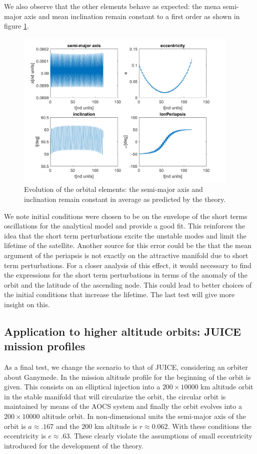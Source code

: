 We also observe that the other elements behave as expected: the mena semi-major axis and mean inclination remain constant to a first order as shown in figure \ref{fig:elementsUnstable}.

\begin{figure}[H]
	\centering
	\includegraphics[height=3in]
	{figures/Europa200km01e60i/elements.png}
	\caption{Evolution of the orbital elements: the semi-major axis and inclination remain constant in average as predicted by the theory.}
	\label{fig:elementsUnstable}
\end{figure}

We note initial conditions were chosen to be on the envelope of the short terms oscillations for the analytical model and provide a good fit. This reinforces the idea that the short term perturbations excite the unstable modes and limit the lifetime of the satellite. Another source for this error could be the that the mean argument of the periapsis is not exactly on the attractive manifold due to short term perturbations. For a closer analysis of this effect, it would necessary to find the expressions for the short term perturbations in terms of the anomaly of the orbit and the latitude of the ascending node. This could lead to better choices of the initial conditions that increase the lifetime. The last test will give more insight on this.

\subsection{Application to higher altitude orbits: JUICE mission profiles}

As a final test, we change the scenario to that of JUICE, considering an orbiter about Ganymede. In \cite{esa2011juice} the mission altitude profile for the beginning of the orbit is given. This consists on an elliptical injection into a $200\times10000$ km altitude orbit in the stable manifold that will circularize the orbit, the circular orbit is maintained by means of the AOCS system and finally the orbit evolves into a $200\times 10000$ altitude orbit. In non-dimensional units the semi-major axis of the orbit is $a\approx.167$ and the $200$ km altitude is $ r \approx 0.062$. With these conditions the eccentricity is $e \approx .63$. These clearly violate the assumptions of small eccentricity introduced for the development of the theory.

